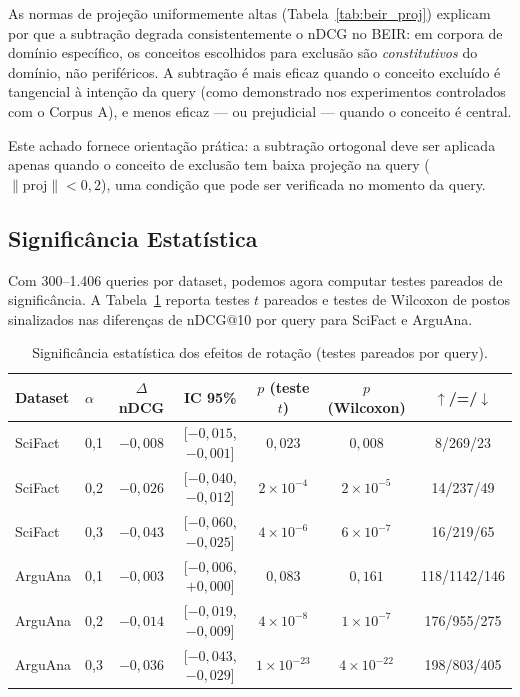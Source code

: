 \documentclass{article}
\begin{document}
As normas de projeção uniformemente altas (Tabela~\ref{tab:beir_proj}) explicam por que a subtração degrada consistentemente o nDCG no BEIR: em corpora de domínio específico, os conceitos escolhidos para exclusão são \emph{constitutivos} do domínio, não periféricos. A subtração é mais eficaz quando o conceito excluído é tangencial à intenção da query (como demonstrado nos experimentos controlados com o Corpus A), e menos eficaz --- ou prejudicial --- quando o conceito é central.

Este achado fornece orientação prática: a subtração ortogonal deve ser aplicada apenas quando o conceito de exclusão tem baixa projeção na query ($\|\text{proj}\| < 0{,}2$), uma condição que pode ser verificada no momento da query.

\subsection{Significância Estatística}

Com 300--1.406 queries por dataset, podemos agora computar testes pareados de significância. A Tabela~\ref{tab:significance} reporta testes $t$ pareados e testes de Wilcoxon de postos sinalizados nas diferenças de nDCG@10 por query para SciFact e ArguAna.

\begin{table}[ht]
\centering
\caption{Significância estatística dos efeitos de rotação (testes pareados por query).}
\label{tab:significance}
\small
\begin{tabular}{llccccc}
\toprule
Dataset & $\alpha$ & $\Delta$ nDCG & IC 95\% & $p$ (teste $t$) & $p$ (Wilcoxon) & $\uparrow$/=/$\downarrow$ \\
\midrule
SciFact & 0,1 & $-0{,}008$ & [$-0{,}015$, $-0{,}001$] & $0{,}023$ & $0{,}008$ & 8/269/23 \\
SciFact & 0,2 & $-0{,}026$ & [$-0{,}040$, $-0{,}012$] & $2 \times 10^{-4}$ & $2 \times 10^{-5}$ & 14/237/49 \\
SciFact & 0,3 & $-0{,}043$ & [$-0{,}060$, $-0{,}025$] & $4 \times 10^{-6}$ & $6 \times 10^{-7}$ & 16/219/65 \\
\addlinespace
ArguAna & 0,1 & $-0{,}003$ & [$-0{,}006$, $+0{,}000$] & $0{,}083$ & $0{,}161$ & 118/1142/146 \\
ArguAna & 0,2 & $-0{,}014$ & [$-0{,}019$, $-0{,}009$] & $4 \times 10^{-8}$ & $1 \times 10^{-7}$ & 176/955/275 \\
ArguAna & 0,3 & $-0{,}036$ & [$-0{,}043$, $-0{,}029$] & $1 \times 10^{-23}$ & $4 \times 10^{-22}$ & 198/803/405 \\
\bottomrule
\end{tabular}
\end{table}
\end{document}
